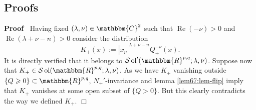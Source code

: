 \documentclass{article}
\newcommand{\assign}{:=}
\newcommand{\tmop}[1]{\ensuremath{\operatorname{#1}}}
\newenvironment{proof}{\noindent\textbf{Proof\ }}{\hspace*{\fill}$\Box$\medskip}
\numberwithin{definition}{section}
\numberwithin{lemma}{section}
\numberwithin{proposition}{section}
{\theorembodyfont{\rmfamily}\newtheorem{remark}{Remark}
\numberwithin{remark}{section}
}
\newcommand{\C}{{\mathbbm{C}}}\newcommand{\Z}{{\mathbbm{Z}}}
\begin{document}
\subsection{Proofs}

\begin{proof}
  Having fixed $(\lambda, \nu) \in \C^2$ such that $\tmop{Re} (- \nu) > 0$ and
  $\tmop{Re} (\lambda + \nu - n) > 0$ consider the distribution
  \[ K_+ (x) \assign | x_p |^{\lambda + \nu - n} Q_+^{- \nu} (x) . \]
  It is directly verified that it belongs to $\mathcal{S} \tmop{ol}' (
  \mathbbm{R}^{p, q} ; \lambda, \nu)$. Suppose now that $K_+ \in \mathcal{S}
  \tmop{ol} ( \mathbbm{R}^{p, q} ; \lambda, \nu)$. As we have $K_+$ vanishing
  outside $\{ Q \geqslant 0 \} \subset \mathbbm{R}^{p, q}$, $N_+'$-invariance
  and lemma \ref{lem67:lem-flip} imply that $K_+$ vanishes at some open subset
  of $\{ Q > 0 \}$. But this clearly contradicts the way we defined $K_+$.
\end{proof}
\end{document}
